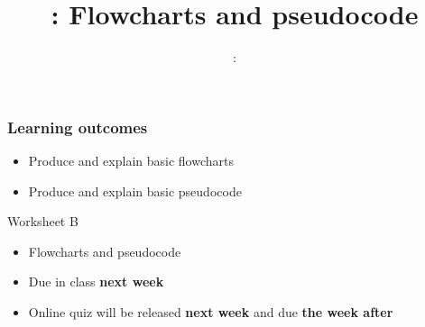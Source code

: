\usepackage{../../beamerthemeFalmouthGamesAcademy}
\usepackage{multimedia}
\graphicspath{ {../../} }

\lstset{language=Python
}

\usepackage[normalem]{ulem}
\usepackage{wasysym}

\usepackage{algpseudocode}

\usepackage{pdfpages}

\usetikzlibrary{arrows,automata}




\title{\sessionnumber: Flowcharts and pseudocode}
\subtitle{\modulecode: \moduletitle}

\frame{\titlepage} 

\begin{frame}
	\frametitle{Learning outcomes}
	\begin{itemize}
		\item Produce and explain basic flowcharts
		\item Produce and explain basic pseudocode
	\end{itemize}
\end{frame}

\begin{frame}{Worksheet B}
	\begin{itemize}
		\item Flowcharts and pseudocode
		\item Due in class \textbf{next week}
		\item Online quiz will be released \textbf{next week} and due \textbf{the week after}
	\end{itemize}
\end{frame}






